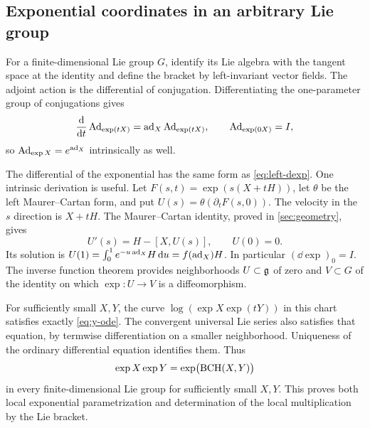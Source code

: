\subsection{Exponential coordinates in an arbitrary Lie group}\label{sec:local-groups}
For a finite-dimensional Lie group $G$, identify its Lie algebra with the tangent space at the identity and define the bracket by left-invariant vector fields. The adjoint action is the differential of conjugation. Differentiating the one-parameter group of conjugations gives
\[
 \frac{\mathrm d}{\mathrm d t}\operatorname{Ad}_{\exp(tX)}=\operatorname{ad}_X\operatorname{Ad}_{\exp(tX)},
 \qquad\operatorname{Ad}_{\exp(0X)}=I,
\]
so $\operatorname{Ad}_{\exp X}=e^{\operatorname{ad}_X}$ intrinsically as well.

The differential of the exponential has the same form as \cref{eq:left-dexp}. One intrinsic derivation is useful. Let
$F(s,t)=\exp(s(X+tH))$, let $\theta$ be the left Maurer--Cartan form, and put
$U(s)=\theta(\partial_tF(s,0))$.
The velocity in the $s$ direction is $X+tH$. The Maurer--Cartan identity, proved in \cref{sec:geometry}, gives
\[
 U'(s)=H-[X,U(s)],\qquad U(0)=0.
\]
Its solution is $U(1)=\int_0^1e^{-u\operatorname{ad}_X}H\,\mathrm d u=f(\operatorname{ad}_X)H$.
In particular $(\dd\exp)_0=I$. The inverse function theorem provides neighborhoods $U\subset\mathfrak g$ of zero and $V\subset G$ of the identity on which $\exp:U\to V$ is a diffeomorphism.

For sufficiently small $X,Y$, the curve $\log(\exp X\exp(tY))$ in this chart satisfies exactly \cref{eq:y-ode}. The convergent universal Lie series also satisfies that equation, by termwise differentiation on a smaller neighborhood. Uniqueness of the ordinary differential equation identifies them. Thus
\begin{equation}\label{eq:local-law}
 \exp X\exp Y=\exp\bigl(\operatorname{BCH}(X,Y)\bigr)
\end{equation}
in every finite-dimensional Lie group for sufficiently small $X,Y$. This proves both local exponential parametrization and determination of the local multiplication by the Lie bracket.

